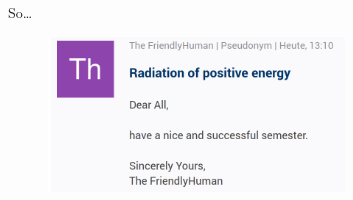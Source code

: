\begin{frame}[t]{So\ldots}
    \begin{figure}[htbp]
        \centering
        \includegraphics[width=0.7\textwidth]{images/positive_energy.png}%
    \end{figure}
\end{frame}

